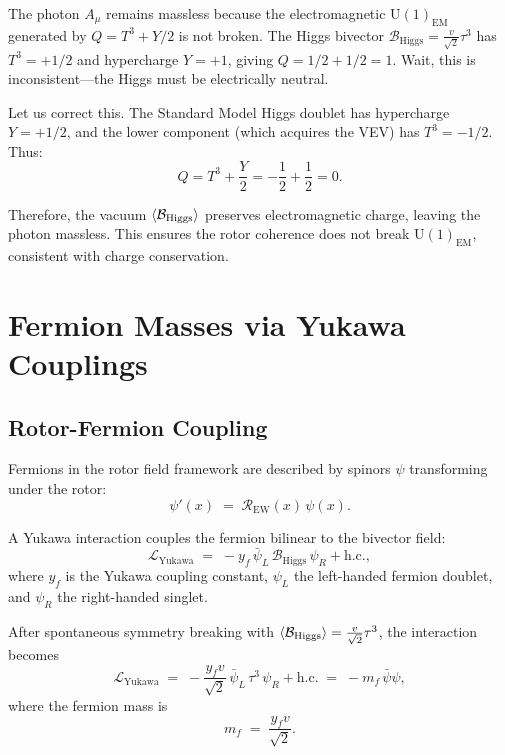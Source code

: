 \documentclass[11pt,a4paper]{article}
\newcommand{\Rotor}{\mathcal{R}}
\newcommand{\Biv}{\mathcal{B}}
\newcommand{\U}{\mathrm{U}}
\newcommand{\Lag}{\mathcal{L}}
\theoremstyle{definition}
\theoremstyle{plain}
\theoremstyle{remark}
\begin{document}
The photon $A_\mu$ remains massless because the electromagnetic $\U(1)_{\text{EM}}$ generated by $Q = T^3 + Y/2$ is not broken. The Higgs bivector $\Biv_{\text{Higgs}} = \frac{v}{\sqrt{2}}\tau^3$ has $T^3 = +1/2$ and hypercharge $Y = +1$, giving $Q = 1/2 + 1/2 = 1$. Wait, this is inconsistent---the Higgs must be electrically neutral.

Let us correct this. The Standard Model Higgs doublet has hypercharge $Y = +1/2$, and the lower component (which acquires the VEV) has $T^3 = -1/2$. Thus:
\begin{equation}
  Q = T^3 + \frac{Y}{2} = -\frac{1}{2} + \frac{1}{2} = 0.
\end{equation}

Therefore, the vacuum $\ev{\Biv_{\text{Higgs}}}$ preserves electromagnetic charge, leaving the photon massless. This ensures the rotor coherence does not break $\U(1)_{\text{EM}}$, consistent with charge conservation.

\vspace{1em}

\section{Fermion Masses via Yukawa Couplings}\label{sec:fermion-masses}

\subsection{Rotor-Fermion Coupling}

Fermions in the rotor field framework are described by spinors $\psi$ transforming under the rotor:
\begin{equation}
  \psi'(x) \;=\; \Rotor_{\text{EW}}(x)\,\psi(x).
\end{equation}

A Yukawa interaction couples the fermion bilinear to the bivector field:
\begin{equation}
  \Lag_{\text{Yukawa}} \;=\; -y_f\, \bar{\psi}_L\, \Biv_{\text{Higgs}}\, \psi_R + \text{h.c.},
  \label{eq:yukawa}
\end{equation}
where $y_f$ is the Yukawa coupling constant, $\psi_L$ the left-handed fermion doublet, and $\psi_R$ the right-handed singlet.

After spontaneous symmetry breaking with $\ev{\Biv_{\text{Higgs}}} = \frac{v}{\sqrt{2}}\tau^3$, the interaction becomes
\begin{equation}
  \Lag_{\text{Yukawa}} \;=\; -\frac{y_f v}{\sqrt{2}}\,\bar{\psi}_L\,\tau^3\,\psi_R + \text{h.c.}
  \;=\; -m_f\,\bar{\psi}\psi,
\end{equation}
where the fermion mass is
\begin{equation}
  \boxed{m_f \;=\; \frac{y_f v}{\sqrt{2}}.}
  \label{eq:fermion-mass}
\end{equation}
\end{document}

